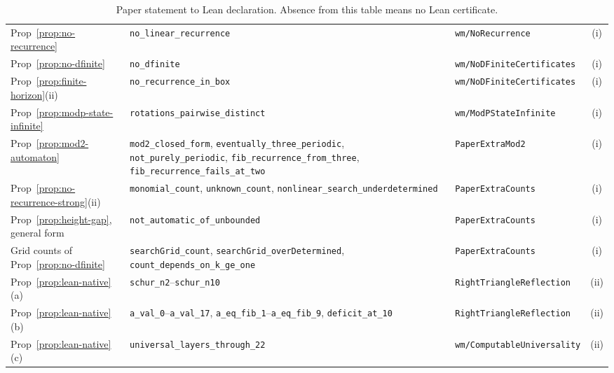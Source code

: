 \documentclass[11pt]{article}
\theoremstyle{plain}
\theoremstyle{definition}
\theoremstyle{remark}
\begin{document}
\begin{table}[htbp]
\begin{tabular}{@{}p{}p{}p{}c@{}}
Prop~\ref{prop:no-recurrence}
  & \texttt{no\_linear\_recurrence}
  & \texttt{wm/NoRecurrence} & (i) \\
Prop~\ref{prop:no-dfinite}
  & \texttt{no\_dfinite}
  & \texttt{wm/NoDFiniteCertificates} & (i) \\
Prop~\ref{prop:finite-horizon}(ii)
  & \texttt{no\_recurrence\_in\_box}
  & \texttt{wm/NoDFiniteCertificates} & (i) \\
Prop~\ref{prop:modp-state-infinite}
  & \texttt{rotations\_pairwise\_distinct}
  & \texttt{wm/ModPStateInfinite} & (i) \\
Prop~\ref{prop:mod2-automaton}
  & \texttt{mod2\_closed\_form}, \texttt{eventually\_three\_periodic},
    \texttt{not\_purely\_periodic}, \texttt{fib\_recurrence\_from\_three},
    \texttt{fib\_recurrence\_fails\_at\_two}
  & \texttt{PaperExtraMod2} & (i) \\
Prop~\ref{prop:no-recurrence-strong}(ii)
  & \texttt{monomial\_count}, \texttt{unknown\_count},
    \texttt{nonlinear\_search\_underdetermined}
  & \texttt{PaperExtraCounts} & (i) \\
Prop~\ref{prop:height-gap}, general form
  & \texttt{not\_automatic\_of\_unbounded}
  & \texttt{PaperExtraCounts} & (i) \\
Grid counts of Prop~\ref{prop:no-dfinite}
  & \texttt{searchGrid\_count}, \texttt{searchGrid\_overDetermined},
    \texttt{count\_depends\_on\_k\_ge\_one}
  & \texttt{PaperExtraCounts} & (i) \\
Prop~\ref{prop:lean-native}(a)
  & \texttt{schur\_n2}--\texttt{schur\_n10}
  & \texttt{RightTriangleReflection} & (ii) \\
Prop~\ref{prop:lean-native}(b)
  & \texttt{a\_val\_0}--\texttt{a\_val\_17},
    \texttt{a\_eq\_fib\_1}--\texttt{a\_eq\_fib\_9}, \texttt{deficit\_at\_10}
  & \texttt{RightTriangleReflection} & (ii) \\
Prop~\ref{prop:lean-native}(c)
  & \texttt{universal\_layers\_through\_22}
  & \texttt{wm/ComputableUniversality} & (ii) \\
\bottomrule
\end{tabular}
\caption{Paper statement to Lean declaration. Absence from this table means
no Lean certificate.}
\label{tab:lean-index}
\end{table}
\end{document}
